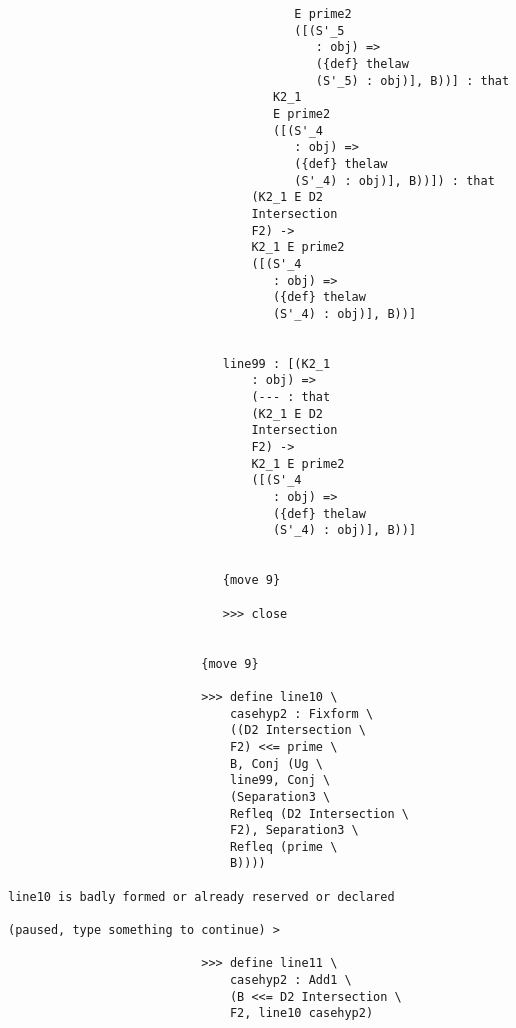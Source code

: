 \documentclass[12pt]{article}
\begin{document}
\begin{verbatim}
                                        E prime2 
                                        ([(S'_5 
                                           : obj) => 
                                           ({def} thelaw 
                                           (S'_5) : obj)], B))] : that 
                                     K2_1 
                                     E prime2 
                                     ([(S'_4 
                                        : obj) => 
                                        ({def} thelaw 
                                        (S'_4) : obj)], B))]) : that 
                                  (K2_1 E D2 
                                  Intersection 
                                  F2) -> 
                                  K2_1 E prime2 
                                  ([(S'_4 
                                     : obj) => 
                                     ({def} thelaw 
                                     (S'_4) : obj)], B))]


                              line99 : [(K2_1 
                                  : obj) => 
                                  (--- : that 
                                  (K2_1 E D2 
                                  Intersection 
                                  F2) -> 
                                  K2_1 E prime2 
                                  ([(S'_4 
                                     : obj) => 
                                     ({def} thelaw 
                                     (S'_4) : obj)], B))]


                              {move 9}

                              >>> close


                           {move 9}

                           >>> define line10 \
                               casehyp2 : Fixform \
                               ((D2 Intersection \
                               F2) <<= prime \
                               B, Conj (Ug \
                               line99, Conj \
                               (Separation3 \
                               Refleq (D2 Intersection \
                               F2), Separation3 \
                               Refleq (prime \
                               B))))

line10 is badly formed or already reserved or declared

(paused, type something to continue) >

                           >>> define line11 \
                               casehyp2 : Add1 \
                               (B <<= D2 Intersection \
                               F2, line10 casehyp2)


\end{verbatim}
\end{document}

